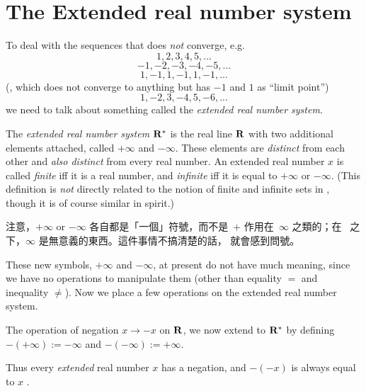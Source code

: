 \section{The Extended real number system} \label{sec 6.2}

To deal with the sequences that does \emph{not} converge, e.g.
\[
    1, 2, 3, 4, 5,...
\]
\[
    -1, -2, -3, -4, -5,...
\]
\[
    1, -1, 1, -1, 1, -1,...
\]
(, which does not converge to anything but has \(-1\) and \(1\) as ``limit point'')
\[
    1, -2, 3, -4, 5, -6,...
\]
we need to talk about something called the \emph{extended real number system}.

\begin{definition}  \label{def 6.2.1}
The \emph{extended real number system} \(\mathbf{R}^*\) is the real line \(\mathbf{R}\) with two additional elements attached, called \(+\infty\) and \(-\infty\).
These elements are \emph{distinct} from each other and \emph{also distinct} from every real number.
An extended real number \(x\) is called \emph{finite} iff it is a real number,
and \emph{infinite} iff it is equal to \(+\infty\) or \(-\infty\).
(This definition is \emph{not} directly related to the notion of finite and infinite sets in , though it is of course similar in spirit.)
\end{definition}

\begin{note}
注意，\(+\infty\) or \(-\infty\) 各自都是「一個」符號，而不是\ \(+\) 作用在\ \(\infty\) 之類的；在\  之下，\(\infty\) 是無意義的東西。這件事情不搞清楚的話， 就會感到問號。
\end{note}

These new symbols, \(+\infty\) and \(-\infty\), at present do not have much meaning, since we have no operations to manipulate them
(other than equality \(=\) and inequality \(\neq\)).
Now we place a few operations on the extended real number system.

\begin{definition}  \label{def 6.2.2}
The operation of negation \(x \to -x\) on \(\mathbf{R}\), we now extend to \(\mathbf{R}^*\) by defining \(-(+\infty) := -\infty\) and \(-(-\infty) := +\infty\).
\end{definition}

Thus every \emph{extended} real number \(x\) has a negation, and \(-(-x)\) is always equal to \(x\) \MAROON{(*)}.

